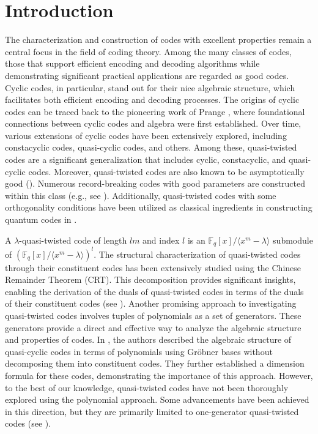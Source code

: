 \documentclass[12 pt]{extarticle}
\numberwithin{equation}{section}
\theoremstyle{definition}
\begin{document}
\section{Introduction}
The characterization and construction of codes with excellent properties remain a central focus in the field of coding theory. Among the many classes of codes, those that support efficient encoding and decoding algorithms while demonstrating significant practical applications are regarded as good codes. Cyclic codes, in particular, stand out for their nice algebraic structure, which facilitates both efficient encoding and decoding processes. The origins of cyclic codes can be traced back to the pioneering work of Prange \cite{prange1957,prange1985}, where foundational connections between cyclic codes and algebra were first established. Over time, various extensions of cyclic codes have been extensively explored, including constacyclic codes, quasi-cyclic codes, and others. Among these, quasi-twisted codes are a significant generalization that includes cyclic, constacyclic, and quasi-cyclic codes. Moreover, quasi-twisted codes are also known to be asymptotically good (\cite{chepyzhov1993,wu2020,kasami1974}). Numerous record-breaking codes with good parameters are constructed within this class (e.g., see \cite{abdukhalikov20251,ackerman2011,aydin2017,daskalov2000,daskalov2003,qian2019}). Additionally, quasi-twisted codes with some orthogonality conditions have been utilized as classical ingredients in constructing quantum codes in \cite{ezerman2024,lv2020,saleh2024}.

A $\lambda$-quasi-twisted code of length $lm$ and index $l$ is an $\mathbb{F}_q[x]/\langle x^m-\lambda\rangle$ submodule of $(\mathbb{F}_q[x]/\langle x^m-\lambda\rangle)^l$. The structural characterization of quasi-twisted codes through their constituent codes has been extensively studied using the Chinese Remainder Theorem (CRT). This decomposition provides significant insights, enabling the derivation of the duals of quasi-twisted codes in terms of the duals of their constituent codes (see \cite{jia2011,lv2020,shi2016,ezerman2024}). Another promising approach to investigating quasi-twisted codes involves tuples of polynomials as a set of generators. These generators provide a direct and effective way to analyze the algebraic structure and properties of codes. 
 In \cite{lally2001}, the authors described the algebraic structure of quasi-cyclic codes in terms of polynomials using Gröbner bases without decomposing them into constituent codes. They further established a dimension formula for these codes, demonstrating the importance of this approach.  However, to the best of our knowledge, quasi-twisted codes have not been thoroughly explored using the polynomial approach.  Some advancements have been achieved in this direction, but they are primarily limited to one-generator quasi-twisted codes (see \cite{aydin2001, daskalov2003,saleh2024}).
\end{document}
